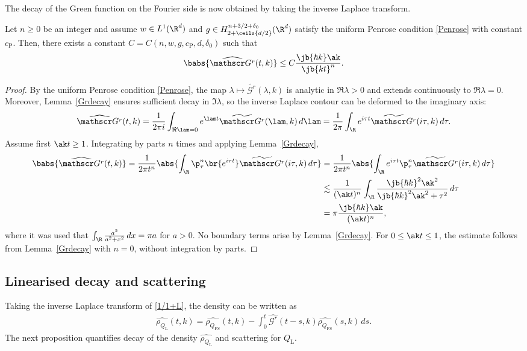 The decay of the Green function on the Fourier side is now obtained by taking the inverse Laplace transform.
\begin{proposition}\label{widehatGrdecay} Let $n\geq0$ be an integer and assume $w\in L^1(\R^d)$ and $g\in H^{n+3/2+\delta_0}_{2+\ceils{d/2}}(\R^d)$ satisfy the uniform Penrose condition \eqref{Penrose} with constant ${c_{\mathrm{P}}}$. Then, there exists a constant $C=C(n,w,g,{c_{\mathrm{P}}},d,\delta_0)$ such that
\begin{align*}
\babs{\widehat {\mathscr G^r}(t,k)}\leq C\frac{\jb{\hbar k}\ak}{\jb{kt}^n}.
\end{align*}
\end{proposition}
\begin{proof}
By the uniform Penrose condition \eqref{Penrose}, the map \( \lambda \mapsto \widetilde{\mathscr{G}^r}(\lambda, k) \) is analytic in \( \Re \lambda > 0 \) and extends continuously to \( \Re \lambda = 0 \). Moreover, Lemma~\ref{Grdecay} ensures sufficient decay in \( \Im \lambda \), so the inverse Laplace contour can be deformed to the imaginary axis:
\begin{align*}
\widehat {\mathscr G^r}(t,k)=\frac{1}{2\pi i}\int_{\Re\lam=0}e^{\lam t}\widetilde {\mathscr G^r}(\lam,k)\,d\lam=\frac{1}{2\pi}\int_\R e^{i\tau t}\widetilde {\mathscr G^r}(i\tau,k)\,d\tau.
\end{align*}Assume first \( \ak t \geq 1 \). Integrating by parts \( n \) times and applying Lemma~\ref{Grdecay},
\begin{align*}
\babs{\widehat {\mathscr G^r}(t,k)}=\frac{1}{2\pi t^n}\abs{\int_\R \p_{\tau}^n\br{e^{i\tau t}}\widetilde {\mathscr G^r}(i\tau,k)\,d\tau}&=\frac{1}{2\pi t^n}\abs{\int_\R e^{i\tau t}\p_{\tau}^n\widetilde {\mathscr G^r}(i\tau,k)\,d\tau}\\
&\lesssim\frac{1}{(\ak t)^n}\int_\R\frac{\jb{\hbar k }^2\ak^2
}{\jb{\hbar k}^2\ak^2+\tau^2}\,d\tau\\
&= \pi \frac{\jb{\hbar k}\ak}{(\ak t)^n},
\end{align*}where it was used that $\int_\R\frac{a^2}{a^2+x^2}\,dx=\pi a$ for $a>0$. No boundary terms arise by Lemma~\ref{Grdecay}. For \( 0 \leq \ak t \leq 1 \), the estimate follows from Lemma~\ref{Grdecay} with \( n = 0 \), without integration by parts.
\end{proof}

\subsection{Linearised decay and scattering}
Taking the inverse Laplace transform of \eqref{1/1+L}, the density can be written as\begin{align}\label{widehatrhoQ}
\widehat{\rho_{Q_{\mathrm{L}}}}(t,k)=\widehat{\rho_{Q_{\mathrm{FS}}}}(t,k)-\int_0^t\widehat {\mathscr G^r}(t-s,k)\widehat{\rho_{Q_{\mathrm{FS}}}}(s,k)\,ds.
\end{align}The next proposition quantifies decay of the density \( \widehat{\rho_{Q_{\mathrm{L}}}} \) and scattering for \( Q_{\mathrm{L}} \).

